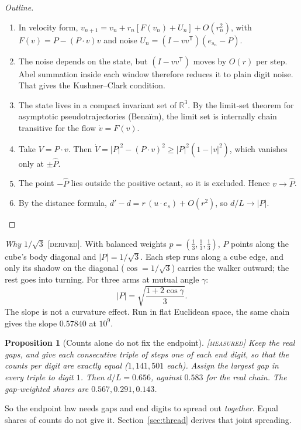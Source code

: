 \documentclass[11pt]{article}
\newtheorem{proposition}{Proposition}
\theoremstyle{definition}
\theoremstyle{remark}
\newcommand{\grade}[1]{\textsc{[#1]}}
\begin{document}
\begin{proof}[Outline]
\begin{enumerate}
\item In velocity form, $v_{n+1}=v_n+r_n[F(v_n)+U_n]+O(r_n^2)$, with $F(v)=P-(P\cdot v)v$ and noise $U_n=(I-vv^{\mathsf T})(e_{s_n}-P)$.
\item The noise depends on the state, but $(I-vv^{\mathsf T})$ moves by $O(r)$ per step. Abel summation inside each window therefore reduces it to plain digit noise. That gives the Kushner--Clark condition.
\item The state lives in a compact invariant set of $\mathbb R^3$. By the limit-set theorem for asymptotic pseudotrajectories (Bena\"im), the limit set is internally chain transitive for the flow $\dot v=F(v)$.
\item Take $V=P\cdot v$. Then $\dot V=|P|^2-(P\cdot v)^2\ge|P|^2(1-|v|^2)$, which vanishes only at $\pm\hat P$.
\item The point $-\hat P$ lies outside the positive octant, so it is excluded. Hence $v\to\hat P$.
\item By the distance formula, $d'-d=r\,(u\cdot e_s)+O(r^2)$, so $d/L\to|P|$.
\end{enumerate}
\end{proof}

\noindent\emph{Why $1/\sqrt3$} \grade{derived}. With balanced weights $p=(\tfrac13,\tfrac13,\tfrac13)$, $P$ points along the cube's body diagonal and $|P|=1/\sqrt3$. Each step runs along a cube edge, and only its shadow on the diagonal ($\cos=1/\sqrt3$) carries the walker outward; the rest goes into turning. For three arms at mutual angle $\gamma$:
\[
|P|=\sqrt{\frac{1+2\cos\gamma}{3}}.
\]
The slope is not a curvature effect. Run in flat Euclidean space, the same chain gives the slope $0.57840$ at $10^9$.

\begin{proposition}[Counts alone do not fix the endpoint] \grade{measured}
Keep the real gaps, and give each consecutive triple of steps one of each end digit, so that the counts per digit are exactly equal ($1{,}141{,}501$ each). Assign the largest gap in every triple to digit $1$. Then $d/L=0.656$, against $0.583$ for the real chain. The gap-weighted shares are $0.567, 0.291, 0.143$.
\end{proposition}
\noindent So the endpoint law needs gaps and end digits to spread out \emph{together}. Equal shares of counts do not give it. Section~\ref{sec:thread} derives that joint spreading.
\end{document}
